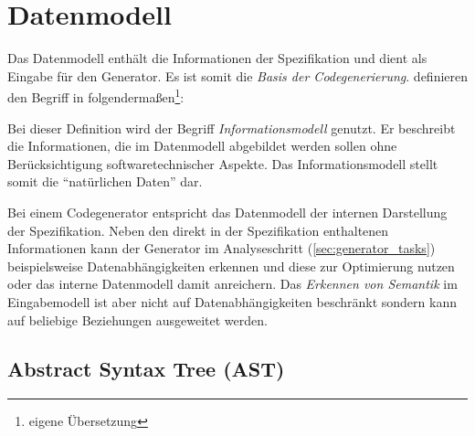 \section{Datenmodell}
\label{sec:datamodel}

Das Datenmodell enthält die Informationen der Spezifikation und dient als Eingabe für den Generator. Es ist somit die \emph{Basis der Codegenerierung}. \citeauthor{rfc3198} definieren den Begriff in \cite{rfc3198} folgendermaßen\footnote{eigene Übersetzung}:


Bei dieser Definition wird der Begriff \emph{Informationsmodell} genutzt. Er beschreibt die Informationen, die im Datenmodell abgebildet werden sollen ohne Berücksichtigung softwaretechnischer Aspekte. Das Informationsmodell stellt somit die \enquote{natürlichen Daten} dar.

Bei einem Codegenerator entspricht das Datenmodell der internen Darstellung der Spezifikation. Neben den direkt in der Spezifikation enthaltenen Informationen kann der Generator im Analyseschritt (\cref{sec:generator_tasks}) beispielsweise Datenabhängigkeiten erkennen und diese zur Optimierung nutzen oder das interne Datenmodell damit anreichern. Das \emph{Erkennen von Semantik} im Eingabemodell ist aber nicht auf Datenabhängigkeiten beschränkt sondern kann auf beliebige Beziehungen ausgeweitet werden. 

\subsection{Abstract Syntax Tree (AST)}
\label{sec:ast}

